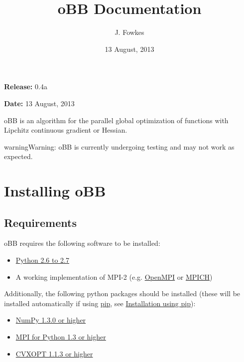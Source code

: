 \documentclass[letterpaper,11pt,openany,oneside]{sphinxmanual}
\title{oBB Documentation}
\date{13 August, 2013}
\author{J. Fowkes}
\begin{document}
\maketitle
\tableofcontents
{}\label{index::doc}


\textbf{Release:} 0.4a

\textbf{Date:} 13 August, 2013

oBB is an algorithm for the parallel global optimization of functions with Lipchitz continuous gradient or Hessian.

\begin{notice}{warning}{Warning:}
oBB is currently undergoing testing and may not work as expected.
\end{notice}


\chapter{Installing oBB}
\label{install:installing-obb}\label{install::doc}\label{install:overlapping-branch-and-bound}

\section{Requirements}
\label{install:requirements}
oBB requires the following software to be installed:
\begin{itemize}
\item {} 
\href{http://www.python.org/}{Python 2.6 to 2.7}

\item {} 
A working implementation of MPI-2 (e.g. \href{http://www.open-mpi.org/}{OpenMPI} or \href{http://www.mpich.org/}{MPICH})

\end{itemize}

Additionally, the following python packages should be installed (these will be installed automatically if using \href{http://www.pip-installer.org/}{pip}, see {\hyperref[install:installation-using-pip]{Installation using pip}}):
\begin{itemize}
\item {} 
\href{http://www.numpy.org/}{NumPy 1.3.0 or higher}

\item {} 
\href{http://mpi4py.scipy.org/}{MPI for Python 1.3 or higher}

\item {} 
\href{http://cvxopt.org/}{CVXOPT 1.1.3 or higher}

\end{itemize}
\end{document}
